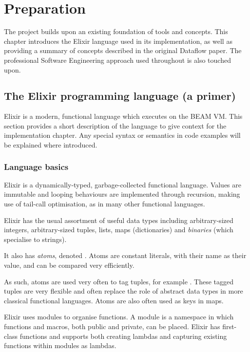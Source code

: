 \chapter{Preparation}\label{ch:prep}

The project builds upon an existing foundation of tools and concepts.
This chapter introduces the Elixir language used in its implementation, as well as providing a summary of concepts described in the original Dataflow paper.
The professional Software Engineering approach used throughout is also touched upon.

\section{The Elixir programming language (a primer)}\label{sec:prep:elixir}

Elixir is a modern, functional language which executes on the BEAM VM.
This section provides a short description of the language to give context for the implementation chapter.
Any special syntax or semantics in code examples will be explained where introduced.

\subsection{Language basics}\label{sec:prep:elixir:basics}


Elixir is a dynamically-typed, garbage-collected functional language.
Values are immutable and looping behaviours are implemented through recursion, making use of tail-call optimisation, as in many other functional languages.

Elixir has the usual assortment of useful data types including arbitrary-sized integers, arbitrary-sized tuples, lists, maps (dictionaries) and \emph{binaries} (which specialise to strings).

It also has \emph{atoms}, denoted .
Atoms are constant literals, with their name as their value, and can be compared very efficiently.

As such, atoms are used very often to tag tuples, for example .
These tagged tuples are very flexible and often replace the role of abstract data types in more classical functional languages.
Atoms are also often used as keys in maps.

Elixir uses modules to organise functions.
A module is a namespace in which functions and macros, both public and private, can be placed.
Elixir has first-class functions and supports both creating lambdas and capturing existing functions within modules as lambdas.

